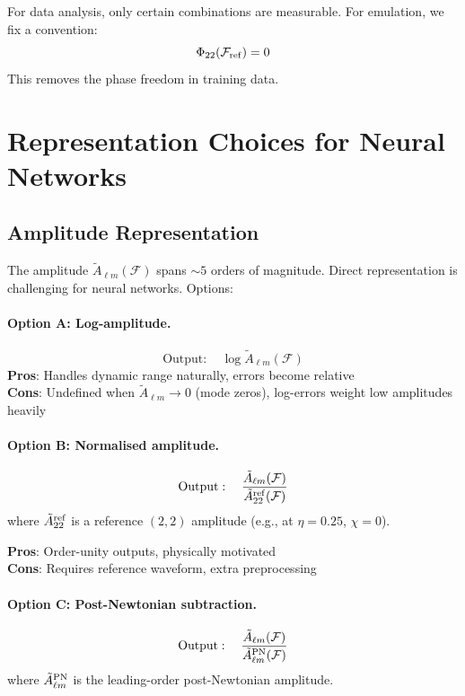 \documentclass[11pt,a4paper]{article}
\newcommand{\Atlm}{\tilde{A}_{\ell m}}
\newcommand{\Mf}{\mathcal{F}}
\begin{document}
For data analysis, only certain combinations are measurable. For emulation, we fix a convention:
\begin{equation}
    \Phi_{22}(\Mf_{\rm ref}) = 0
\end{equation}
This removes the phase freedom in training data.

\section{Representation Choices for Neural Networks}
\label{sec:representation}

\subsection{Amplitude Representation}

The amplitude $\Atlm(\Mf)$ spans $\sim 5$ orders of magnitude. Direct representation is challenging for neural networks. Options:

\paragraph{Option A: Log-amplitude.}
\begin{equation}
    \text{Output}: \quad \log \Atlm(\Mf)
\end{equation}
\textbf{Pros}: Handles dynamic range naturally, errors become relative \\
\textbf{Cons}: Undefined when $\Atlm \to 0$ (mode zeros), log-errors weight low amplitudes heavily

\paragraph{Option B: Normalised amplitude.}
\begin{equation}
    \text{Output}: \quad \frac{\Atlm(\Mf)}{\tilde{A}_{22}^{\rm ref}(\Mf)}
\end{equation}
where $\tilde{A}_{22}^{\rm ref}$ is a reference $(2,2)$ amplitude (e.g., at $\eta = 0.25$, $\chi = 0$).

\textbf{Pros}: Order-unity outputs, physically motivated \\
\textbf{Cons}: Requires reference waveform, extra preprocessing

\paragraph{Option C: Post-Newtonian subtraction.}
\begin{equation}
    \text{Output}: \quad \frac{\Atlm(\Mf)}{\Atlm^{\rm PN}(\Mf)}
\end{equation}
where $\Atlm^{\rm PN}$ is the leading-order post-Newtonian amplitude.
\end{document}
